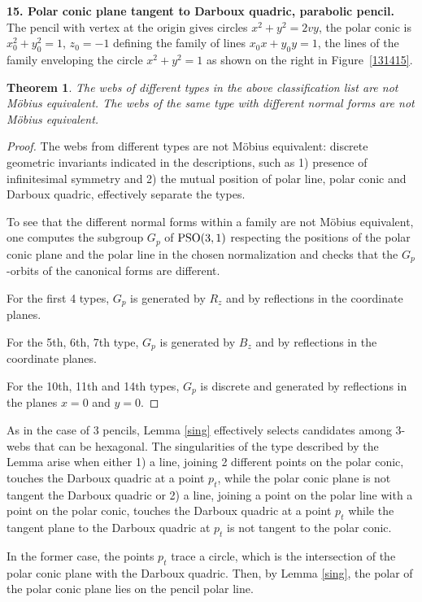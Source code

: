 \documentclass[pdftex]{sigma}
\numberwithin{equation}{section}
\newtheorem{Theorem}{Theorem}[section]
\begin{document}
 {\bf 15. Polar conic plane tangent to Darboux quadric, parabolic pencil.}
 The pencil with vertex at the origin gives circles
$
x^2 + y^2=2vy$,
the polar conic is
$
x_0^2 + y_0^2 =1$, $ z_0=-1
$ defining the family of lines $x_0x + y_0y = 1$, the lines of the family enveloping the circle $ x^2 + y^2 = 1$ as shown on the right in Figure~\ref{131415}.

\begin{Theorem}
The webs of different types in the above classification list are not M\"obius equivalent. The webs of the same type with different normal forms are not M\"obius equivalent.
\end{Theorem}
\begin{proof} The webs from different types are not M\"obius equivalent: discrete geometric invariants indicated in the descriptions, such as 1) presence of infinitesimal symmetry and 2) the mutual position of polar line, polar conic and Darboux quadric, effectively separate the types.

To see that the different normal forms within a family are not M\"obius equivalent, one computes the subgroup $G_p$ of ${\rm PSO}(3,1)$ respecting the positions of the polar conic plane and the polar line in the chosen normalization and checks that the $G_p$-orbits of the canonical forms are different.

For the first 4 types, $G_p$ is generated by $R_z$ and by reflections in the coordinate planes.

For the 5th, 6th, 7th type, $G_p$ is generated by $B_z$ and by reflections in the coordinate planes.

For the 10th, 11th and 14th types, $G_p$ is discrete and generated by reflections in the planes $x=0$ and $y=0$.
\end{proof}


As in the case of 3 pencils, Lemma \ref{sing} effectively selects candidates among 3-webs that can be hexagonal. The singularities of the type described by the Lemma arise when either 1) a line, joining 2 different points on the polar conic, touches the Darboux quadric at a point $p_t$, while the polar conic plane is not tangent the Darboux quadric or 2) a line, joining a point on the polar line with a point on the polar conic, touches the Darboux quadric at a point $p_t$ while the tangent plane to the Darboux quadric at $p_t$ is not tangent to the polar conic.

In the former case, the points $p_t$ trace a circle, which is the intersection of the polar conic plane with the Darboux quadric. Then, by Lemma \ref{sing}, the polar of the polar conic plane lies on the pencil polar line.
\end{document}
